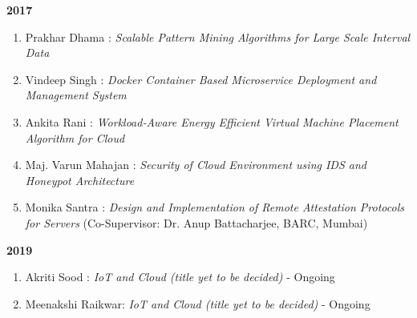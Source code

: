 \textbf{2017}

\begin{enumerate} [label=(MT\arabic*)., resume] 
\item		Prakhar Dhama : 	\textit{	Scalable Pattern Mining Algorithms for Large Scale Interval Data}
\item		Vindeep Singh : 	\textit{	Docker Container Based Microservice Deployment and Management System}	
\item		Ankita Rani : 	\textit{	Workload-Aware Energy Efficient Virtual Machine Placement Algorithm for Cloud}	
\item		Maj. Varun Mahajan : 	\textit{	Security of Cloud Environment using IDS and Honeypot Architecture}
\item		Monika Santra : 	\textit{	Design and Implementation of Remote Attestation Protocols for Servers} (Co-Supervisor:	Dr. Anup Battacharjee, BARC, Mumbai)
\end{enumerate}

\textbf{2019}

\begin{enumerate} [label=(MT\arabic*)., resume] 
\item		Akriti Sood	: 	\textit{IoT and Cloud (title yet to be decided)}	-	Ongoing
\item		Meenakshi Raikwar: 	\textit{IoT and Cloud (title yet to be decided)}	-	Ongoing
	\end{enumerate}